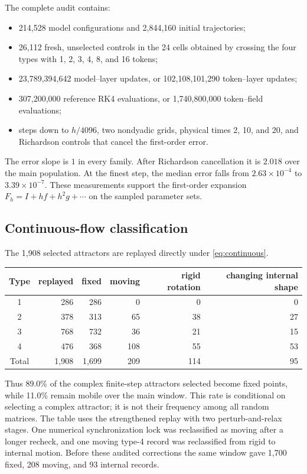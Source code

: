 \documentclass[11pt,a4paper]{article}
\theoremstyle{definition}
\begin{document}
The complete audit contains:
\begin{itemize}
  \item 214,528 model configurations and 2,844,160 initial trajectories;
  \item 26,112 fresh, unselected controls in the 24 cells obtained by crossing the
  four types with 1, 2, 3, 4, 8, and 16 tokens;
  \item 23,789,394,642 model--layer updates, or 102,108,101,290 token--layer updates;
  \item 307,200,000 reference RK4 evaluations, or 1,740,800,000 token--field evaluations;
  \item steps down to $h/4096$, two nondyadic grids, physical times 2, 10, and 20, and
  Richardson controls that cancel the first-order error.
\end{itemize}

The error slope is $1$ in every family. After Richardson cancellation it is $2.018$
over the main population. At the finest step, the median error falls from
$2.63\times10^{-4}$ to $3.39\times10^{-7}$. These measurements support the
first-order expansion $F_h=I+hf+h^2g+\cdots$ on the sampled parameter sets.

\subsection{Continuous-flow classification}

The 1,908 selected attractors are replayed directly under \eqref{eq:continuous}.
\begin{center}
\begin{tabular}{crrrrr}
\toprule
Type & replayed & fixed & moving & rigid rotation & changing internal shape \\
\midrule
1 & 286 & 286 & 0 & 0 & 0 \\
2 & 378 & 313 & 65 & 38 & 27 \\
3 & 768 & 732 & 36 & 21 & 15 \\
4 & 476 & 368 & 108 & 55 & 53 \\
\midrule
Total & 1,908 & 1,699 & 209 & 114 & 95 \\
\bottomrule
\end{tabular}
\end{center}

Thus 89.0\% of the complex finite-step attractors selected become fixed points, while
11.0\% remain mobile over the main window. This rate is conditional on selecting a
complex attractor; it is not their frequency among all random matrices.  The table
uses the strengthened replay with two perturb-and-relax stages.  One numerical
synchronization lock was reclassified as moving after a longer recheck, and one
moving type-4 record was reclassified from rigid to internal motion.  Before these
audited corrections the same window gave 1,700 fixed, 208 moving, and 93 internal
records.
\end{document}
